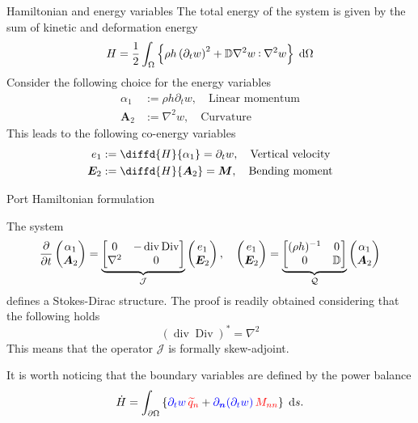 \documentclass[aspectratio=169]{ISAE-Beamer}
\DeclareMathOperator*{\Div}{Div}
\renewcommand{\div}{\operatorname{div}}
\def\onedot{$\mathsurround0pt\ldotp$}
\def\cddot{%
	\mathbin{\vcenter{\baselineskip.67ex
			\hbox{\onedot}\hbox{\onedot}}%
}}
\begin{document}
\begin{frame}{Hamiltonian and energy variables}
The total energy of the system is given by the sum of kinetic and deformation energy
\[
H = \frac{1}{2} \int_{\Omega} \left\{\rho h \left(\partial_t w\right)^2 + \mathbb{D} \nabla^2 w \cddot \nabla^2 w \right\} \d{\Omega}
\] 
Consider the following choice for the energy variables
\begin{align*}
	\alpha_1 &:= \rho h \partial_t w, \quad \text{Linear momentum} \\
	\bm{A}_2 &:=  \nabla^2 w, \quad \text{Curvature}
\end{align*}
This leads to the following co-energy variables
\begin{align*}
e_1 &:= \diffd{H}{\alpha_1} =  \partial_t w, \quad \text{Vertical velocity} \\
\bm{E}_2 &:= \diffd{H}{\bm{A}_2} = \bm{M}, \quad \text{Bending moment}
\end{align*}
\end{frame}

\begin{frame}{Port Hamiltonian formulation}
\begin{tcolorbox}
The system
\begin{equation*}
\diffp{}{t} \begin{pmatrix}
\alpha_1 \\ \bm{A}_2
\end{pmatrix} =
\underbrace{\begin{bmatrix}
0 & -\div\Div \\
\nabla^2 & 0 \\
\end{bmatrix}}_{\mathcal{J}} \begin{pmatrix}
{e}_1 \\ \bm{E}_2
\end{pmatrix}, \quad \begin{pmatrix}
{e}_1 \\ \bm{E}_2
\end{pmatrix} = \underbrace{\begin{bmatrix}
(\rho h)^{-1} & 0 \\
0 & \mathbb{D} \\
\end{bmatrix}}_{\mathcal{Q}}
\begin{pmatrix}
\alpha_1 \\ \bm{A}_2
\end{pmatrix}
\end{equation*}
defines a Stokes-Dirac structure. The proof is readily obtained considering that the following holds
\[ (\div \Div)^* = \nabla^2\]
This means that the operator $\mathcal{J}$ is formally skew-adjoint.
\end{tcolorbox}
It is worth noticing that the boundary variables are defined by the power balance
\[
\dot{H} = \int_{\partial \Omega} \left\{ \textcolor{blue}{\partial_t w} \, \textcolor{red}{\widetilde{q}_n} + \textcolor{blue}{\partial_{\bm{n}} (\partial_t w)} \, \textcolor{red}{M_{nn}} \right\}  \d{s}.
\]

\end{frame}
\end{document}
